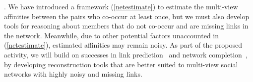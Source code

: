 
\label{sec:reconstruct}


. We have introduced a framework (\ref{netestimate}) to estimate the multi-view affinities between the pairs who co-occur at least once, but we must also develop tools for reasoning about members that do not co-occur and are missing links in the network. Meanwhile, due to other potential factors unaccounted in (\ref{netestimate}), estimated affinities may remain noisy.  As part of the proposed activity, we will build on successes in link prediction~\cite{Goldberg,Liben-Nowell,TaskarWAK03} and network completion~\cite{Clauset,Guimera,HannekeX09,KimL11}, by developing reconstruction tools that are better suited to multi-view social networks with highly noisy and missing links.


